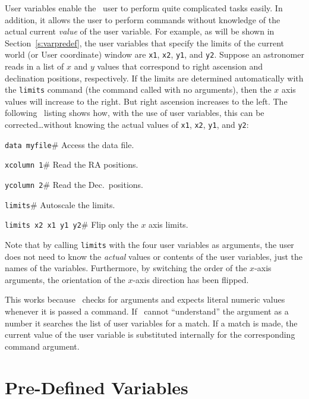 User variables enable the \wip\ user to perform quite
complicated tasks easily.
In addition, it allows the user to perform commands without knowledge of
the actual current {\em value} of the user variable.
For example, as will be shown in Section~\ref{s:varpredef}, the user
variables that specify the limits of the current
world (or User coordinate) window are
{\tt x1}, {\tt x2}, {\tt y1}, and {\tt y2}.
Suppose an astronomer reads in a list of $x$ and $y$ values that
correspond to right ascension and declination positions, respectively.
If the limits are determined automatically with the
{\tt limits} command
(\ie the command called with no arguments),
then the $x$ axis values will increase
to the right.
But right ascension increases to the left.
The following \wip\ listing shows how, with the use of user variables,
this can be corrected\ldots without knowing the actual values of
{\tt x1}, {\tt x2}, {\tt y1}, and {\tt y2}:
\begin{wiplist}%
  \item {\tt data myfile}\hfill\# Access the data file.
\samepage
  \item {\tt xcolumn 1}\hfill\# Read the RA positions.
  \item {\tt ycolumn 2}\hfill\# Read the Dec.\ positions.
  \item {\tt limits}\hfill\# Autoscale the limits.
  \item {\tt limits x2 x1 y1 y2}\hfill\# Flip only the $x$ axis limits.
\end{wiplist}
Note that by calling {\tt limits} with the four user variables as
arguments, the user does not need to know the {\em actual} values or
contents of the user variables, just the names of the variables.
Furthermore, by switching the order of the $x$-axis arguments, the
orientation of the $x$-axis direction has been flipped.

This works because \wip\
checks for arguments and expects literal numeric values
whenever it is passed a command.
If \wip\ cannot ``understand'' the argument as a number it searches the
list of user variables for a match.
If a match is made, the current value of the user variable is
substituted internally for the corresponding command argument.

\section		{Pre-Defined Variables}

